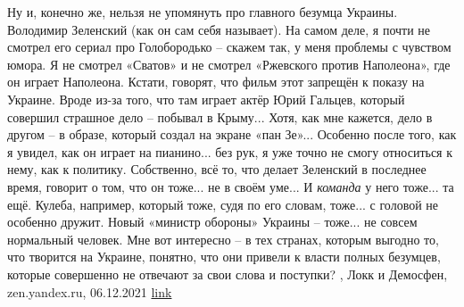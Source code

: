 Ну и, конечно же, нельзя не упомянуть про главного безумца Украины. Володимир
Зеленский (как он сам себя называет). На самом деле, я почти не смотрел его
сериал про Голобородько – скажем так, у меня проблемы с чувством юмора. Я не
смотрел «Сватов» и не смотрел «Ржевского против Наполеона», где он играет
Наполеона. Кстати, говорят, что фильм этот запрещён к показу на Украине. Вроде
из-за того, что там играет актёр Юрий Гальцев, который совершил страшное дело –
побывал в Крыму... Хотя, как мне кажется, дело в другом – в образе, который
создал на экране «пан Зе»... Особенно после того, как я увидел, как он играет на
пианино... без рук, я уже точно не смогу относиться к нему, как к политику.
Собственно, всё то, что делает Зеленский в последнее время, говорит о том, что
он тоже... не в своём уме... И \emph{команда} у него тоже... та ещё. Кулеба, например,
который тоже, судя по его словам, тоже... с головой не особенно дружит. Новый
«министр обороны» Украины – тоже... не совсем нормальный человек. Мне вот
интересно – в тех странах, которым выгодно то, что творится на Украине,
понятно, что они привели к власти полных безумцев, которые совершенно не
отвечают за свои слова и поступки? 
, Локк и Демосфен, zen.yandex.ru, 06.12.2021
\href{https://zen.yandex.ru/media/lokk_demosfen/zarazno-li-bezumie-61abce1e84b4641179199952}{link}
